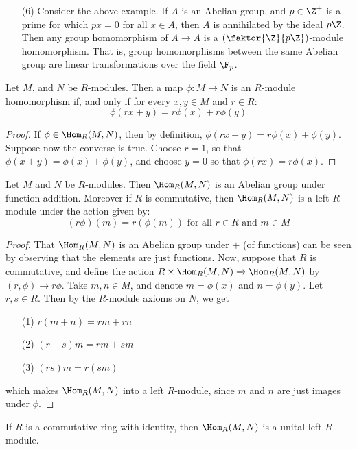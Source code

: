 \begin{example}
\begin{enumerate}
     \item[(6)] Consider the above example. If $A$ is an Abelian
       group, and  $p \in \Z^+$ is a prime for which $px=0$ for all
       $x \in A$, then $A$ is annihilated by the ideal $p\Z$. Then any
       group homomorphism of $A \xrightarrow{} A$ is a
       $(\faktor{\Z}{p\Z})$-module homomorphism. That is, group
       homomorphisms between the same Abelian group are linear
       transformations over the field $\F_p$.
  \end{enumerate}
\end{example}

\begin{theorem}\label{theorem_4.2.2}
  Let $M$, and $N$ be $R$-modules. Then a map $\phi:M \xrightarrow{}
  N$ is an $R$-module homomorphism if, and only if for every  $x,y \in
  M$ and $r \in R$:
  \begin{equation*}
    \phi(rx+y)=r\phi(x)+r\phi(y)
  \end{equation*}
\end{theorem}
\begin{proof}
  If $\phi \in \Hom_R{(M,N)}$, then by definition,
  $\phi(rx+y)=r\phi(x)+\phi(y)$. Suppose now the converse is true.
  Choose $r=1$, so that $\phi(x+y)=\phi(x)+\phi(y)$, and choose $y=0$
  so that $\phi(rx)=r\phi(x)$.
\end{proof}

\begin{theorem}\label{theorem_4.2.3}
  Let $M$ and $N$ be $R$-modules. Then $\Hom_R{(M,N)}$ is an Abelian
  group under function addition. Moreover if $R$ is commutative, then
   $\Hom_R{(M,N)}$ is a left $R$-module under the action given by:
  \begin{equation*}
    (r\phi)(m)=r(\phi(m)) \text{ for all } r \in R \text{ and } m \in M
  \end{equation*}
\end{theorem}
\begin{proof}
  That $\Hom_R{(M,N)}$ is an Abelian group under $+$ (of functions)
  can be seen by observing that the elements are just functions. Now,
  suppose that $R$ is commutative, and define the action $R \times
  \Hom_R{(M,N)} \xrightarrow{} \Hom_R{(M,N)}$ by $(r,\phi)
  \xrightarrow{} r\phi$. Take $m,n \in M$, and denote $m=\phi(x)$ and
  $n=\phi(y)$. Let $r,s \in R$. Then by the $R$-module axioms on $N$,
  we get
  \begin{enumerate}
    \item[(1)] $r(m+n)=rm+rn$

    \item[(2)] $(r+s)m=rm+sm$

    \item[(3)] $(rs)m=r(sm)$
  \end{enumerate}
  which makes $\Hom_R{(M,N)}$ into a left $R$-module, since $m$ and
  $n$ are just images under $\phi$.
\end{proof}
\begin{corollary}
  If $R$ is a commutative ring with identity, then $\Hom_R{(M,N)}$ is
  a unital left $R$-module.
\end{corollary}

